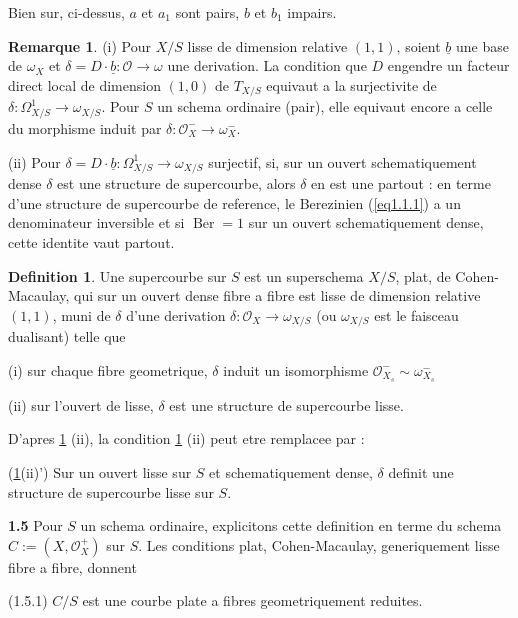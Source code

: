 \documentclass[11pt,a4paper]{article}
\theoremstyle{plain}
\theoremstyle{definition}
\newtheorem{definition}[theorem]{Definition}
\newtheorem{remark}[theorem]{Remarque}
\DeclareMathOperator{\Ber}{Ber}
\begin{document}
Bien sur, ci-dessus, $a$ et $a_1$ sont pairs, $b$ et $b_1$ impairs.

\begin{remark}\label{rem1.3}
(i) Pour $X/S$ lisse de dimension relative $(1,1)$, soient $\underline{b}$ une base de $\omega_X$ et $\delta = D \cdot \underline{b} : \mathcal{O} \to \omega$ une derivation. La condition que $D$ engendre un facteur direct local de dimension $(1,0)$ de $T_{X/S}$ equivaut a la surjectivite de $\delta : \Omega^1_{X/S} \to \omega_{X/S}$. Pour $S$ un schema ordinaire (pair), elle equivaut encore a celle du morphisme induit par $\delta : \mathcal{O}_X^- \to \omega_X^-$.

(ii) Pour $\delta = D \cdot \underline{b} : \Omega^1_{X/S} \to \omega_{X/S}$ surjectif, si, sur un ouvert schematiquement dense $\delta$ est une structure de supercourbe, alors $\delta$ en est une partout : en terme d'une structure de supercourbe de reference, le Berezinien (\ref{eq1.1.1}) a un denominateur inversible et si $\Ber = 1$ sur un ouvert schematiquement dense, cette identite vaut partout.
\end{remark}

\begin{definition}\label{def1.4}
Une supercourbe sur $S$ est un superschema $X/S$, plat, de Cohen-Macaulay, qui sur un ouvert dense fibre a fibre est lisse de dimension relative $(1,1)$, muni de $\delta$ d'une derivation $\delta : \mathcal{O}_X \to \omega_{X/S}$ (ou $\omega_{X/S}$ est le faisceau dualisant) telle que

\noindent (i) sur chaque fibre geometrique, $\delta$ induit un isomorphisme $\mathcal{O}_{X_s}^- \sim \omega_{X_s}^-$

\noindent (ii) sur l'ouvert de lisse, $\delta$ est une structure de supercourbe lisse.
\end{definition}

D'apres \ref{rem1.3} (ii), la condition \ref{def1.4} (ii) peut etre remplacee par :

\noindent (\ref{def1.4}(ii)') Sur un ouvert lisse sur $S$ et schematiquement dense, $\delta$ definit une structure de supercourbe lisse sur $S$.

\medskip

\noindent \textbf{1.5} Pour $S$ un schema ordinaire, explicitons cette definition en terme du schema $C := (X, \mathcal{O}_X^+)$ sur $S$. Les conditions plat, Cohen-Macaulay, generiquement lisse fibre a fibre, donnent

\noindent (1.5.1) $C/S$ est une courbe plate a fibres geometriquement reduites.
\end{document}
